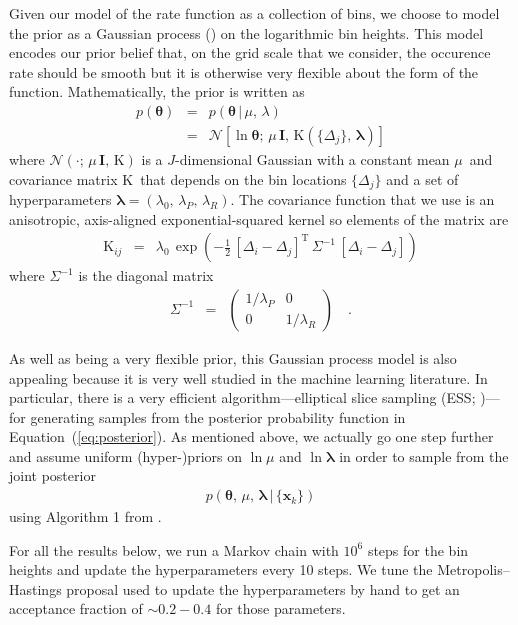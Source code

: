 \documentclass[12pt,preprint]{aastex}
\newcommand{\Eq}[1]{Equation~(\ref{eq:#1})}
\newcommand{\eq}[1]{\Eq{#1}}
\newcommand{\bvec}[1]{\ensuremath{\boldsymbol{#1}}}
\newcommand{\ratepar}{{\ensuremath{\theta}}}
\newcommand{\ratepars}{{\ensuremath{\bvec{\ratepar}}}}
\newcommand{\radius}{\ensuremath{R}}
\newcommand{\period}{\ensuremath{P}}
\newcommand{\data}{{\ensuremath{\bvec{x}}}}
\newcommand{\binarea}{{\ensuremath{\Delta}}}
\newcommand{\mean}{{\ensuremath{\mu}}}
\newcommand{\smooth}{{\ensuremath{\lambda}}}
\newcommand{\smoothpars}{{\ensuremath{\bvec{\smooth}}}}
\newcommand{\cov}{{\ensuremath{\mathrm{K}}}}
\begin{document}
Given our model of the rate function as a collection of bins, we choose to
model the prior as a Gaussian process (\citealt{gp,gibson-gp}) on the
logarithmic bin heights.
This model encodes our prior belief that, on the grid scale that we consider,
the occurence rate should be smooth but it is otherwise very flexible about
the form of the function.
Mathematically, the prior is written as
\begin{eqnarray}
p(\ratepars) &=& p(\ratepars\,|\,\mean,\,\smooth) \\
&=& \mathcal{N} \left[\ln\ratepars;\,\mean\,\bvec{I},\,
\cov(\{\binarea_j\},\,\smoothpars)\right]
\end{eqnarray}
where $\mathcal{N}(\cdot;\,\mean\,\bvec{I},\,\cov)$ is a $J$-dimensional
Gaussian with a constant mean \mean\ and covariance matrix \cov\ that depends
on the bin locations $\{\binarea_j\}$ and a set of hyperparameters
$\smoothpars = (\smooth_0,\,\smooth_\period,\,\smooth_\radius)$.
The covariance function that we use is an anisotropic, axis-aligned
exponential-squared kernel so elements of the matrix are
\begin{eqnarray}
\cov_{ij} &=& \smooth_0\,\exp\left(-\frac{1}{2}\,
    [\binarea_i-\binarea_j]^\mathrm{T}\,\Sigma^{-1}\,[\binarea_i-\binarea_j]
\right)
\end{eqnarray}
where $\Sigma^{-1}$ is the diagonal matrix
\begin{eqnarray}
\Sigma^{-1} &=& \left(\begin{array}{cc}
1/\smooth_\period & 0 \\
0 & 1/\smooth_\radius
\end{array}\right) \quad.
\end{eqnarray}

As well as being a very flexible prior, this Gaussian process model is also
appealing because it is very well studied in the machine learning literature.
In particular, there is a very efficient algorithm---elliptical slice sampling
(ESS; \citealt{ess})---for generating samples from the posterior probability
function in \eq{posterior}.
As mentioned above, we actually go one step further and assume uniform
(hyper-)priors on $\ln\mean$ and $\ln\smoothpars$ in order to sample from the
joint posterior
\begin{eqnarray}
p(\ratepars,\,\mean,\,\smoothpars\,|\,\{\data_k\})
\end{eqnarray}
using Algorithm 1 from \citet{ess-hyper}.

For all the results below, we run a Markov chain with $10^6$ steps for the bin
heights and update the hyperparameters every 10 steps.
We tune the Metropolis--Hastings proposal used to update the hyperparameters
by hand to get an acceptance fraction of $\sim0.2-0.4$ for those parameters.
\end{document}
